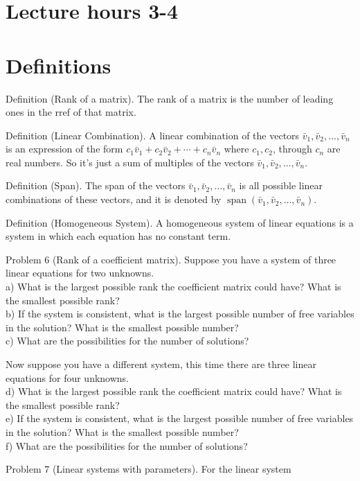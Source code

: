 \documentclass[10pt]{article}
\begin{document}
\section*{Lecture hours 3-4}
\section*{Definitions}
Definition (Rank of a matrix). The rank of a matrix is the number of leading ones in the rref of that matrix.

Definition (Linear Combination). A linear combination of the vectors $\bar{v}_{1}, \bar{v}_{2}, \ldots, \bar{v}_{n}$ is an expression of the form $c_{1} \bar{v}_{1}+c_{2} \bar{v}_{2}+\cdots+c_{n} \bar{v}_{n}$ where $c_{1}, c_{2}$, through $c_{n}$ are real numbers. So it's just a sum of multiples of the vectors $\bar{v}_{1}, \bar{v}_{2}, \ldots, \bar{v}_{n}$.

Definition (Span). The span of the vectors $\bar{v}_{1}, \bar{v}_{2}, \ldots, \bar{v}_{n}$ is all possible linear combinations of these vectors, and it is denoted by $\operatorname{span}\left(\bar{v}_{1}, \bar{v}_{2}, \ldots, \bar{v}_{n}\right)$.

Definition (Homogeneous System). A homogeneous system of linear equations is a system in which each equation has no constant term.

Problem 6 (Rank of a coefficient matrix). Suppose you have a system of three linear equations for two unknowns.\\
a) What is the largest possible rank the coefficient matrix could have? What is the smallest possible rank?\\
b) If the system is consistent, what is the largest possible number of free variables in the solution? What is the smallest possible number?\\
c) What are the possibilities for the number of solutions?

Now suppose you have a different system, this time there are three linear equations for four unknowns.\\
d) What is the largest possible rank the coefficient matrix could have? What is the smallest possible rank?\\
e) If the system is consistent, what is the largest possible number of free variables in the solution? What is the smallest possible number?\\
f) What are the possibilities for the number of solutions?

Problem 7 (Linear systems with parameters). For the linear system
\end{document}
